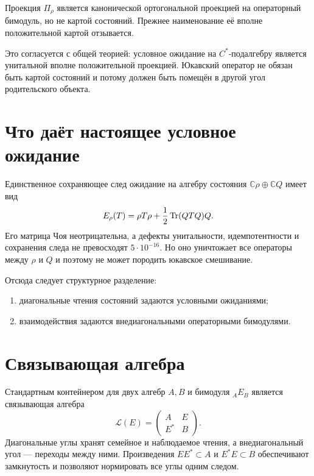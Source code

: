 \begin{theorem}
Проекция $\Pi_\rho$ является канонической ортогональной проекцией на
операторный бимодуль, но не картой состояний. Прежнее наименование её
вполне положительной картой отзывается.
\end{theorem}

Это согласуется с общей теорией: условное ожидание на $C^*$-подалгебру
является унитальной вполне положительной проекцией. Юкавский оператор не
обязан быть картой состояний и потому должен быть помещён в другой угол
родительского объекта.

\section{Что даёт настоящее условное ожидание}

Единственное сохраняющее след ожидание на алгебру состояния
$\mathbb C\rho\oplus\mathbb C Q$ имеет вид
\begin{equation}
 E_\rho(T)=\rho T\rho+\frac12\operatorname{Tr}(QTQ)Q.
\end{equation}
Его матрица Чоя неотрицательна, а дефекты унитальности, идемпотентности и
сохранения следа не превосходят $5\cdot10^{-16}$. Но оно уничтожает все
операторы между $\rho$ и $Q$ и поэтому не может породить юкавское смешивание.

Отсюда следует структурное разделение:
\begin{enumerate}
 \item диагональные чтения состояний задаются условными ожиданиями;
 \item взаимодействия задаются внедиагональными операторными бимодулями.
\end{enumerate}

\section{Связывающая алгебра}

Стандартным контейнером для двух алгебр $A,B$ и бимодуля
${}_AE_B$ является связывающая алгебра
\begin{equation}
 \mathcal L(E)=
 \begin{pmatrix}
 A&E\\ E^*&B
 \end{pmatrix}.
 \label{eq:v5-linking-algebra}
\end{equation}
Диагональные углы хранят семейное и наблюдаемое чтения, а внедиагональный
угол --- переходы между ними. Произведения $EE^*\subset A$ и
$E^*E\subset B$ обеспечивают замкнутость и позволяют нормировать все углы
одним следом.

